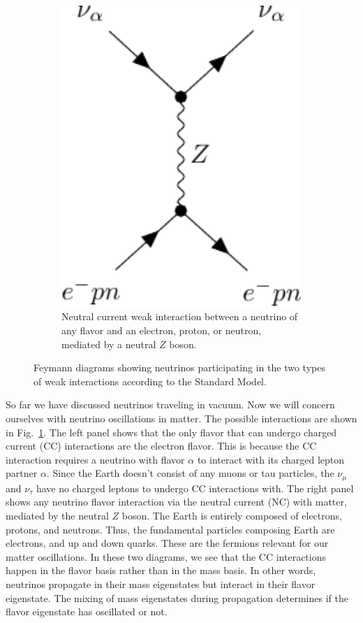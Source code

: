 \begin{figure}
\begin{subfigure}{0.3\textwidth}
        \includegraphics[width=1\textwidth]{figures/z-boson.pdf} 
        \caption{Neutral current weak interaction between a neutrino of any flavor and an electron, proton, or neutron,
        mediated by a neutral $Z$ boson.}
    \end{subfigure}
    \caption{Feymann diagrams showing neutrinos participating in the two types of weak interactions according to the Standard Model.}\label{fig:w_and_z}
\end{figure}
So far we have discussed neutrinos traveling in vacuum. Now we will concern ourselves with neutrino oscillations in matter.
The possible interactions are shown in Fig.~\ref{fig:w_and_z}. The left panel shows that the only flavor that can undergo charged current (CC) 
interactions are the electron flavor. This is because the CC interaction requires a neutrino with flavor $\alpha$ to interact with its charged lepton
partner $\alpha$. Since the Earth doesn't consist of any muons or tau particles, the $\nu_\mu$ and $\nu_\tau$ have no charged leptons to undergo CC interactions with. 
The right panel shows any neutrino flavor interaction via the neutral current (NC) with matter, mediated by the neutral $Z$ boson. The Earth is entirely composed
of electrons, protons, and neutrons. Thus, the fundamental particles composing Earth are electrons, and up and down quarks. These are the
fermions relevant for our matter oscillations. In these two diagrams, we see that the CC interactions happen in the flavor basis rather than in the mass basis. In other words,
neutrinos propagate in their mass eigenstates but interact in their flavor eigenstate. The mixing of mass eigenstates during propagation
determines if the flavor eigenstate has oscillated or not.

